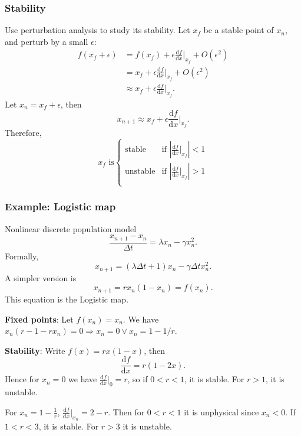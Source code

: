 \documentclass[a4paper]{article}
\begin{document}
    \subsubsection{Stability}
    Use perturbation analysis to study its stability. Let $ x_f $ be a stable point of $x_n$, and perturb by a small $ \epsilon $:
    \[
        \begin{aligned}
            f(x_f+\epsilon)&=f(x_f)+\epsilon \frac{\mathrm{d}f}{\mathrm{d}x}\Big|_{x_f}+O(\epsilon^2) \\
            &= x_f+\epsilon \frac{\mathrm{d}f}{\mathrm{d}x}\Big|_{x_f}+O(\epsilon^2)\\
            &\approx x_f+\epsilon \frac{\mathrm{d}f}{\mathrm{d}x}\Big|_{x_f}.
        \end{aligned}
    \]
    Let $ x_n= x_f+\epsilon$, then 
    \[
        x_{n+1}\approx x_f+\epsilon \frac{\mathrm{d}f}{\mathrm{d}x}\Big|_{x_f}.
    \]
    Therefore,
    \[
        x_f \text{ is} \begin{cases}
        \text{stable} &\text{if } \left| \frac{\mathrm{d}f}{\mathrm{d}x}\Big|_{x_f} \right| <1\\
        \text{unstable} &\text{if }\left| \frac{\mathrm{d}f}{\mathrm{d}x}\Big|_{x_f} \right| >1\\
        \end{cases} 
    \]
    \subsubsection{Example: Logistic map}
    Nonlinear discrete population model 
    \[
        \frac{x_{n+1}-x_n}{\Delta t}=\lambda x_n-\gamma x_{n}^2
    .\]
    Formally,
    \[
        x_{n+1}=(\lambda \Delta t+1) x_n-\gamma \Delta t x_n^2
    .\]
    A simpler version is 
    \[
        x_{n+1}=rx_n(1-x_n)=f(x_n)
    .\]
    This equation is the Logistic map.
    
    \textbf{Fixed points}: Let $ f(x_n)=x_n $. We have $ x_n(r-1-rx_n)=0 \Rightarrow x_n=0 \lor x_n=1-1/r $.

    \textbf{Stability}: Write $ f(x)=rx(1-x) $, then 
    \[
        \frac{\mathrm{d}f}{\mathrm{d}x}=r(1-2x) 
    .\]
    Hence for $x_n=0$ we have $ \frac{\mathrm{d}f}{\mathrm{d}x}\Big|_0=r $, so if $ 0<r<1 $, it is stable. For $ r>1 $, it is unstable.

    For $ x_n=1-\frac{1}{r} $, $ \frac{\mathrm{d}f}{\mathrm{d}x}\Big|_{x_n}=2-r  $. Then for $ 0<r<1 $ it is unphysical since $x_n<0$. If $ 1<r<3 $, it is stable. For $ r>3 $ it is unstable.
\end{document}
